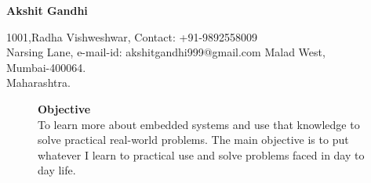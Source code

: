 \documentclass{article}
\begin{document}
	
	\begin{center}
		{
			\Large\textbf{Akshit Gandhi}
		}
		
	\end{center}
	
	\begin{flushleft}
		1001,Radha Vishweshwar, 		\hspace{2.8in}    		    Contact: +91-9892558009            \\
		Narsing Lane, 		\hspace{2.85in}		    e-mail-id: akshitgandhi999@gmail.com \hspace{2.8in}
		Malad West, \\
		Mumbai-400064.     \\
		Maharashtra.\\
		
	\end{flushleft}
	\vspace{-0.3in}
	\begin{figure}[h]
		{%
		\hspace{4.4in}
\setlength{\fboxsep}{2.5pt}%
\setlength{\fboxrule}{1pt}%
%
}%
		\begin{flushleft}
\textrm{\textbf{Objective}}\\
\textrm{To learn more about embedded systems and use that knowledge to solve practical real-world problems. The main objective is to put whatever I learn to practical use and solve problems faced in day to day life.}
\end{flushleft}
	\end{figure}
	
	
	
\end{document}

